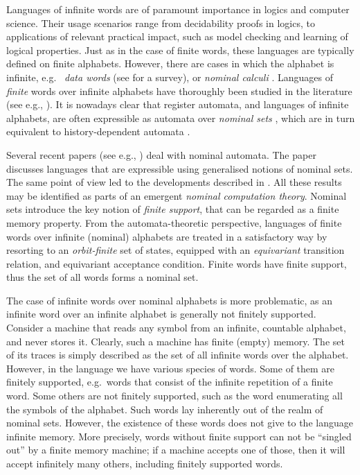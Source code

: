 


Languages of infinite words are of paramount importance in logics and computer science. Their usage scenarios range from decidability proofs in logics, 
 to applications of relevant practical impact, such as model checking and learning of logical properties. Just as in the case of finite words, these languages are typically defined on finite alphabets. However, there are cases in which the alphabet is infinite, e.g.\
\emph{data words} (see \cite{Seg06} for  a survey), or \emph{nominal calculi} \cite{MPW92}. Languages of \emph{finite} words over infinite alphabets have thoroughly been studied in the literature (see e.g., \cite{KF94,Tze11}). 
It is nowadays clear that register automata, and languages of infinite alphabets, are often expressible as automata over \emph{nominal sets} \cite{GP02}, which are in turn equivalent  to history-dependent automata \cite{Pistore99,FioreS06,GadducciMM06}. 

Several recent papers (see e.g., \cite{Tze11,KST12,GC11}) deal with nominal automata. The paper \cite{BojanczykKL11} discusses languages that are expressible using generalised notions of nominal sets. The same point of view led to the developments described in \cite{BBKL12,LP13,BKLT13}. All these results may be identified as parts of an emergent
\emph{nominal computation theory}. Nominal sets introduce the key notion of \emph{finite support}, that can be regarded as a finite memory property. From the automata-theoretic perspective, languages of finite words over infinite (nominal) alphabets are treated in a satisfactory way by resorting to an \emph{orbit-finite} set of states, equipped with an \emph{equivariant} transition relation, and equivariant acceptance condition. Finite words have finite support, thus the set of all words forms a nominal set. 

The case of infinite words over nominal alphabets is more problematic, as an infinite word over an infinite alphabet is generally not finitely supported. Consider a machine that reads any symbol from an infinite, countable alphabet, and never stores it. Clearly, such a machine has finite (empty) memory. The set of its traces is simply described as the set of all infinite words over the alphabet. However, in the language we have various species of words. Some of them are finitely supported, e.g.\ words that consist of the infinite repetition of a finite word. Some others are not finitely supported, such as the word enumerating all the symbols of the alphabet. Such words lay inherently out of the realm of nominal sets. However, the existence of these words does not give to the language infinite memory. More precisely,  words without finite support can not be ``singled out'' by a finite memory machine; if a machine accepts one of those, then it will accept infinitely many others, including finitely supported words.  

